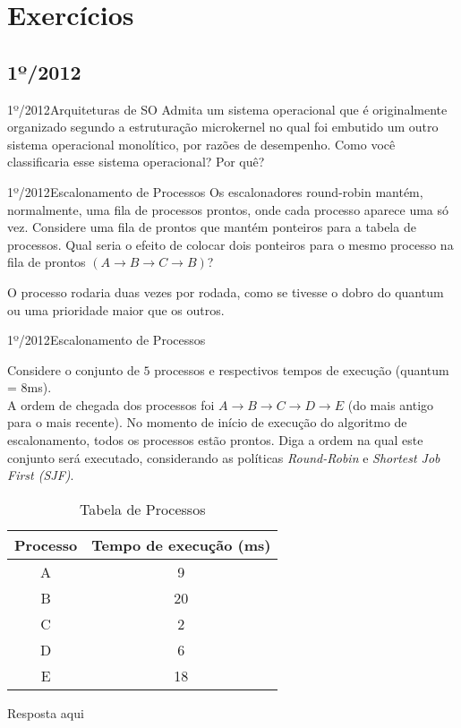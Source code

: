 \chapter{Exercícios}

\section{1º/2012}
\begin{exercicio}
  {1º/2012}{Arquiteturas de SO}
  {Admita um sistema operacional que é originalmente organizado segundo a estruturação microkernel no qual foi embutido um outro sistema operacional monolítico, por razões de desempenho. Como você classificaria esse sistema operacional? Por quê?}
\end{exercicio}

\begin{exercicio}
  {1º/2012}{Escalonamento de Processos}
  {Os escalonadores round-robin mantém, normalmente, uma fila de processos prontos, onde cada processo aparece uma só vez. Considere uma fila de prontos que mantém ponteiros para a tabela de processos. Qual seria o efeito de colocar dois ponteiros para o mesmo processo na fila de prontos $(A \rightarrow B \rightarrow C \rightarrow B)$?
  }

  O processo rodaria duas vezes por rodada, como se tivesse o dobro do quantum ou uma prioridade maior que os outros.
\end{exercicio}

\begin{exercicio}
  {1º/2012}{Escalonamento de Processos}
  {Considere o conjunto de $5$ processos e respectivos tempos de execução (quantum = $8$ms). \\
  A ordem de chegada dos processos foi $A \rightarrow B \rightarrow C \rightarrow D \rightarrow E$ (do mais antigo para o mais recente). No momento de início de execução do algoritmo de escalonamento, todos os processos estão prontos. Diga a ordem na qual este conjunto será executado, considerando as políticas \textit{Round-Robin} e \textit{Shortest Job First (SJF)}.
  \begin{table}[!h]
      \centering
      \begin{tabular}{cc}
        \hline \hline
        \textbf{Processo} & \textbf{Tempo de execução (ms)} \\ \hline
        A                 & 9                               \\
        B                 & 20                              \\
        C                 & 2                               \\
        D                 & 6                               \\
        E                 & 18                              \\
        \hline \hline
      \end{tabular}
      \caption{Tabela de Processos}
      \label{tab:ex3}
    \end{table}
  }

  Resposta aqui
\end{exercicio}

